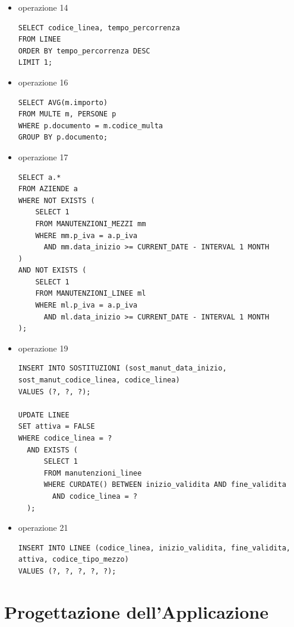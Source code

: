 \documentclass[12pt,a4paper]{report}
\begin{document}
\begin{itemize}
\item operazione 14
\begin{lstlisting}[style=sqlstyle, caption=Query for Line with Maximum Tempo Percorrenza]
SELECT codice_linea, tempo_percorrenza
FROM LINEE
ORDER BY tempo_percorrenza DESC
LIMIT 1;
\end{lstlisting}

\item operazione 16

\begin{lstlisting}[style=sqlstyle, caption=Query for Average Fine Amount Grouped by Documento]
SELECT AVG(m.importo)
FROM MULTE m, PERSONE p
WHERE p.documento = m.codice_multa
GROUP BY p.documento;
\end{lstlisting}

\item operazione 17
\begin{lstlisting}[style=sqlstyle, caption=Query for Companies Without Maintenance in Last Month]
SELECT a.*
FROM AZIENDE a
WHERE NOT EXISTS (
    SELECT 1
    FROM MANUTENZIONI_MEZZI mm
    WHERE mm.p_iva = a.p_iva
      AND mm.data_inizio >= CURRENT_DATE - INTERVAL 1 MONTH
)
AND NOT EXISTS (
    SELECT 1
    FROM MANUTENZIONI_LINEE ml
    WHERE ml.p_iva = a.p_iva
      AND ml.data_inizio >= CURRENT_DATE - INTERVAL 1 MONTH
);
\end{lstlisting}

\item operazione 19
\begin{lstlisting}[style=sqlstyle, caption=Insert into SOSTITUZIONI and Update LINEE status]
INSERT INTO SOSTITUZIONI (sost_manut_data_inizio, sost_manut_codice_linea, codice_linea)
VALUES (?, ?, ?);

UPDATE LINEE
SET attiva = FALSE
WHERE codice_linea = ?
  AND EXISTS (
      SELECT 1
      FROM manutenzioni_linee
      WHERE CURDATE() BETWEEN inizio_validita AND fine_validita
        AND codice_linea = ?
  );
\end{lstlisting}

\item operazione 21
\begin{lstlisting}[style=sqlstyle, caption=Insert Statement for LINEE]
INSERT INTO LINEE (codice_linea, inizio_validita, fine_validita, attiva, codice_tipo_mezzo)
VALUES (?, ?, ?, ?, ?);
\end{lstlisting}

\end{itemize}

\chapter{Progettazione dell'Applicazione}
\end{document}
